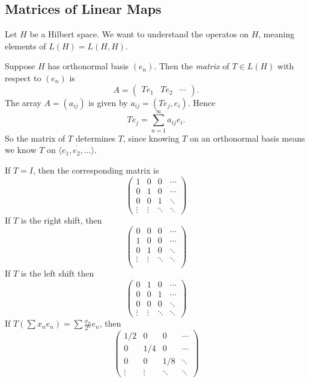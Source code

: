 \documentclass[12pt]{article}
\begin{document}
\subsection{Matrices of Linear Maps}
\label{sub:matrices}

Let $H$ be a Hilbert space. We want to understand the operatos on $H$, meaning elements of $L(H) = L(H,H)$.

Suppose $H$ has orthonormal basis $(e_n)$. Then the \emph{matrix} of $T \in L(H)$ with respect to $(e_n)$ is
\[
A =
\begin{pmatrix}
	Te_1 & Te_2 & \cdots
\end{pmatrix}.
\]
The array $A = (a_{ij})$ is given by $a_{ij} = (Te_j, e_i)$. Hence
\[
Te_j = \sum_{n = 1}^{\infty} a_{ij} e_i.
\]
So the matrix of $T$ determines $T$, since knowing $T$ on an orthonormal basis means we know $T$ on $\overline{\langle e_1, e_2, \ldots \rangle}$.

\begin{exbox}
	If $T = I$, then the corresponding matrix is
	\[
	\begin{pmatrix}
		1 & 0 & 0 & \cdots \\
		 0 & 1 & 0 & \cdots \\
		 0 & 0 & 1 & \ddots \\
		\vdots & \vdots & \ddots &\ddots
	\end{pmatrix}
	\]
	If $T$ is the right shift, then
	\[
	\begin{pmatrix}
		0 & 0 & 0 & \cdots \\
		1 & 0 & 0 & \cdots \\
		 0 & 1 & 0 & \ddots \\
		 \vdots & \vdots & \ddots & \ddots\\
	\end{pmatrix}
	\]
	If $T$ is the left shift then
	\[
	\begin{pmatrix}
		 0 & 1 & 0 & \cdots\\
		 0 & 0 & 1 & \cdots \\
		0 & 0 & 0 &\ddots \\
		\vdots & \vdots & \ddots & \ddots
	\end{pmatrix}
	\]
	If $T(\sum x_n e_n) = \sum \frac{x_n}{2^n} e_n$, then
	\[
	\begin{pmatrix}
		1/2 & 0 & 0 & \cdots \\
		 0 & 1/4 & 0 & \cdots \\
		 0 & 0 & 1/8 & \ddots \\
		\vdots & \vdots & \ddots &\ddots
	\end{pmatrix}
	\]
\end{exbox}
\end{document}
